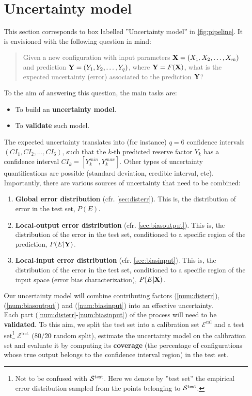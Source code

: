 \section{Uncertainty model}\label{sec:uncertainty}
This section corresponds to box labelled ''Uncertainty model'' in \autoref{fig:pipeline}. It is envisioned with the following question in mind:
\begin{quotation}
	Given a new configuration with input parameters ${\bf X}=(X_1,X_2,\dots,X_m)$ and prediction ${\bf Y}=(Y_1,Y_2,\dots,Y_q)$, where ${\bf Y}=F({\bf X})$, what is the expected uncertainty (error) associated to the prediction $\bf Y$?
\end{quotation}
%
To the aim of answering this question, the main tasks are:
\begin{itemize}
	\item To build an \textbf{uncertainty model}.
	\item To \textbf{validate} such model.\\
\end{itemize}
%
\indent The expected uncertainty translates into (for instance) $q=6$ confidence intervals $(CI_{1},CI_{2},\dots,CI_{6})$, such that the $k$-th predicted reserve factor $Y_k$ has a confidence interval $CI_k=[Y_k^{min},Y_k^{max}]$. Other types of uncertainty quantifications are possible (standard deviation, credible interval, etc).\\
%
\indent Importantly, there are various sources of uncertainty that need to be combined:
\begin{enumerate}
	\item \textbf{Global error distribution} (cfr. \autoref{sec:disterr}). This is, the distribution of error in the test set, $P(E)$.\label{num:disterr}
	\item \textbf{Local-output error distribution} (cfr. \autoref{sec:biasoutput}). This is, the distribution of the error in the test set, conditioned to a specific region of the prediction, $P(E|{\bf Y})$.\label{num:biasoutput}
	\item \textbf{Local-input error distribution} (cfr. \autoref{sec:biasinput}). This is, the distribution of the error in the test set, conditioned to a specific region of the input space (error bias characterization), $P(E|{\bf X})$.\label{num:biasinput}\\
\end{enumerate}
%
\indent Our uncertainty model will combine contributing factors (\ref{num:disterr}), (\ref{num:biasoutput}) and (\ref{num:biasinput}) into an effective uncertainty.\\
%
\indent Each part (\ref{num:disterr}-\ref{num:biasinput}) of the process will need to be \textbf{validated}. To this aim, we split the test set into a calibration set $\mathcal{E}^\text{cal}$ and a test set\footnote{Not to be confused with $\cal{S}^\text{test}$. Here we denote by ''test set'' the empirical error distribution sampled from the points belonging to $\cal{S}^\text{test}$.} $\mathcal{E}^\text{test}$ (80/20 random split), estimate the uncertainty model on the calibration set and evaluate it by computing its \textbf{coverage} (\ie the percentage of configurations whose true output belongs to the confidence interval region) in the test set.\\
